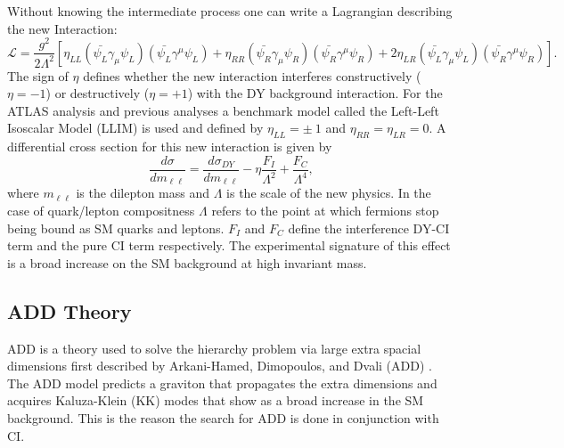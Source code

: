 Without knowing the intermediate process one can write a Lagrangian describing the new Interaction:
\begin{equation}
        \mathcal{L} = \frac{g^{2}}{2\Lambda^{2}}
                [\eta_{LL} (\bar{\psi_{L}}\gamma_{\mu}\psi_{L}) (\bar{\psi_{L}}\gamma^{\mu}\psi_{L}) 
                + \eta_{RR} (\bar{\psi_{R}}\gamma_{\mu}\psi_{R}) (\bar{\psi_{R}}\gamma^{\mu}\psi_{R}) 
                + 2\eta_{LR} (\bar{\psi_{L}}\gamma_{\mu}\psi_{L}) (\bar{\psi_{R}}\gamma^{\mu}\psi_{R}) ].
\end{equation}
The sign of $\eta$ defines whether the new interaction interferes constructively ($\eta = -1$) or destructively ($\eta = +1$) with the DY background interaction. For the ATLAS analysis and previous analyses \cite{CDF, D0} a benchmark model called the Left-Left Isoscalar Model (LLIM) is used and defined by $\eta_{LL} = \pm~1$ and $\eta_{RR} = \eta_{LR} = 0$.
A differential cross section for this new interaction is given by
\begin{equation}
        \frac{d\sigma}{dm_{\ell\ell}} = 
                \frac{d\sigma_{DY}}{dm_{\ell\ell}} 
                - \eta\frac{F_{I}}{\Lambda^{2}} 
                + \frac{F_{C}}{\Lambda^{4}},
\label{eq:DiffCross}
\end{equation}
where $m_{\ell\ell}$ is the dilepton mass and $\Lambda$ is the scale of the new physics. In the case of quark/lepton compositness $\Lambda$ refers to the point at which fermions stop being bound as SM quarks and leptons. $F_{I}$ and $F_{C}$ define the interference DY-CI term and the pure CI term respectively. The experimental signature of this effect is a broad increase on the SM background at high invariant mass.








\subsection{ADD Theory}
ADD is a theory used to solve the hierarchy problem via large extra spacial dimensions first described by Arkani-Hamed, Dimopoulos, and Dvali (ADD) \cite{ADD}. The ADD model predicts a graviton that propagates the extra dimensions and acquires Kaluza-Klein (KK) modes that show as a broad increase in the SM background. This is the reason the search for ADD is done in conjunction with CI.


